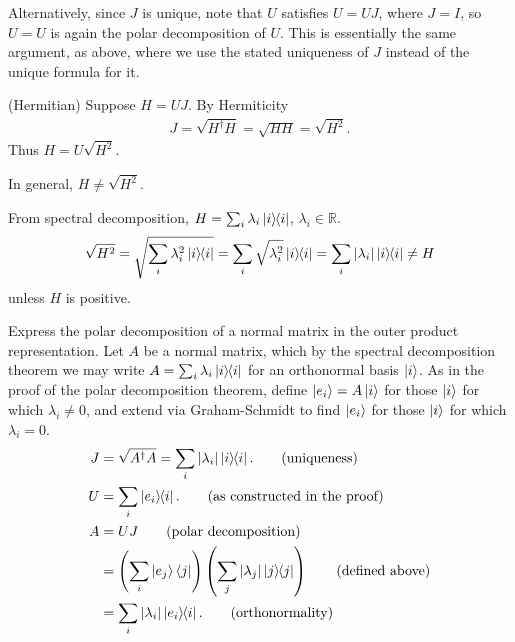 Alternatively, since $J$ is unique, note that $U$ satisfies $U=UJ$, where $J=I$, so $U=U$ is again the polar decomposition of $U$.  This is essentially the same argument, as above, where we use the stated uniqueness of $J$ instead of the unique formula for it.

\vspace{3mm}
(Hermitian) Suppose $H = UJ$.  By Hermiticity
\begin{align*}
	J = \sqrt{H^\dagger H} = \sqrt{HH} = \sqrt{H^2}.
\end{align*}
Thus $H = U\sqrt{H^2}$.

\begin{screen}
	In general, $H \neq \sqrt{H^2}$.

	From spectral decomposition, $H = \sum_i \lambda_i \ket{i}\hspace{-1mm} \bra{i}$, $\lambda_i \in \mathds{R}$.
	\begin{align*}
		 \sqrt{H^2} = \sqrt{ \sum_i \lambda_i^2 \ket{i}\hspace{-1mm} \bra{i} }
		 =
 		\sum_i
 			\sqrt{
 				\lambda_i^2
			} \ket{i}\hspace{-1mm} \bra{i}
		= \sum_i | \lambda_i | \ket{i}\hspace{-1mm} \bra{i} \neq H
	\end{align*}
unless $H$ is positive.
\end{screen}

 Express the polar decomposition of a normal matrix in the outer product representation.
\Soln
Let $A$ be a normal matrix, which by the spectral decomposition theorem we may write $A = \sum_i \lambda_i \ket{i}\hspace{-1mm} \bra{i}$ for an orthonormal basis $\ket{i}$.  As in the proof of the polar decomposition theorem, define $\ket{e_i} = A\ket{i}$ for those $\ket{i}$  for which $\lambda_i\neq 0$, and extend via Graham-Schmidt to find $\ket{e_i}$ for those $\ket{i}$ for which $\lambda_i=0$.    
\begin{align*}
	J &= \sqrt{A^\dagger A} = \sum_i | \lambda_i | \ket{i}\hspace{-1mm} \bra{i}. \tag{uniqueness}\\
	U &= \sum_i \ket{e_i}\hspace{-1mm} \bra{i}.\tag{as constructed in the proof}\\
	A &= UJ \tag{polar decomposition} \\
	  &= \left(\sum_i \ket{e_j}\bra{j}\right)\left(\sum_j |\lambda_j|\ket{j}\hspace{-1mm} \bra{j}\right) \tag{defined above} \\ 
	  &= \sum_i |\lambda_i| \ket{e_i}\hspace{-1mm} \bra{i}. \tag{orthonormality}
\end{align*}

